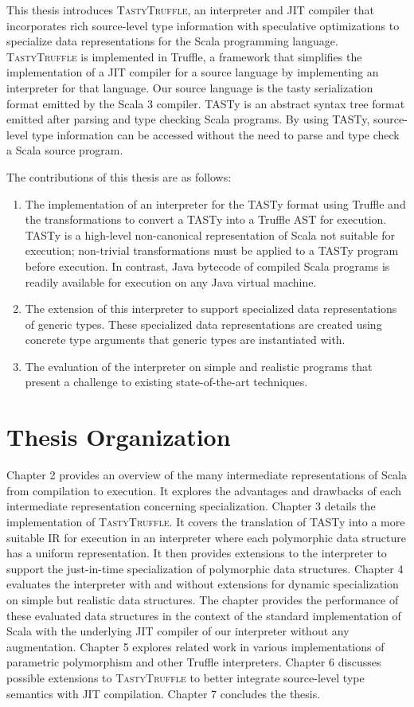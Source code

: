 This thesis introduces \textsc{TastyTruffle}, an interpreter and JIT compiler that incorporates rich source-level type information with speculative optimizations to specialize data representations for the Scala programming language.
\textsc{TastyTruffle} is implemented in Truffle, a framework that simplifies the implementation of a JIT compiler for a source language by implementing an interpreter for that language. 
Our source language is the \acrfull{tasty} serialization format emitted by the Scala 3 compiler.
TASTy is an abstract syntax tree format emitted after parsing and type checking Scala programs.
By using TASTy, source-level type information can be accessed without the need to parse and type check a Scala source program.

The contributions of this thesis are as follows: 
\begin{enumerate}
	\item The implementation of an interpreter for the TASTy format using Truffle and the transformations to convert a TASTy into a Truffle AST for execution. TASTy is a high-level non-canonical representation of Scala not suitable for execution; non-trivial transformations must be applied to a TASTy program before execution.
	In contrast, Java bytecode of compiled Scala programs is readily available for execution on any Java virtual machine.
	\item The extension of this interpreter to support specialized data representations of generic types.
	These specialized data representations are created using concrete type arguments that generic types are instantiated with.
	\item The evaluation of the interpreter on simple and realistic programs that present a challenge to existing state-of-the-art techniques.
\end{enumerate}

\newpage

\section{Thesis Organization}

Chapter 2 provides an overview of the many intermediate representations of Scala from compilation to execution.
It explores the advantages and drawbacks of each intermediate representation concerning specialization.
Chapter 3 details the implementation of \textsc{TastyTruffle}.
It covers the translation of TASTy into a more suitable IR for execution in an interpreter where each polymorphic data structure has a uniform representation.
It then provides extensions to the interpreter to support the just-in-time specialization of polymorphic data structures.
Chapter 4 evaluates the interpreter with and without extensions for dynamic specialization on simple but realistic data structures.
The chapter provides the performance of these evaluated data structures in the context of the standard implementation of Scala with the underlying JIT compiler of our interpreter without any augmentation.
Chapter 5 explores related work in various implementations of parametric polymorphism and other Truffle interpreters.
Chapter 6 discusses possible extensions to \textsc{TastyTruffle} to better integrate source-level type semantics with JIT compilation.
Chapter 7 concludes the thesis.